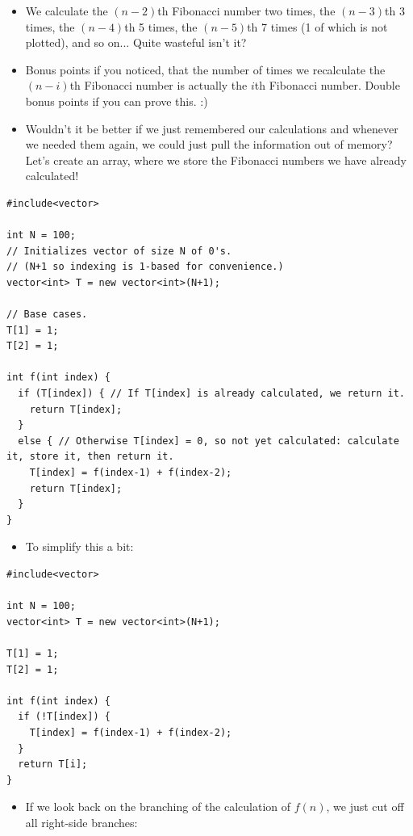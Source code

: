 \begin{itemize}
    \item We calculate the $(n-2)$th Fibonacci number two times, the $(n-3)$th 3 times, the $(n-4)$th 5 times, the $(n-5)$th 7 times (1 of which is not plotted), and so on... Quite wasteful isn't it?
    \item Bonus points if you noticed, that the number of times we recalculate the $(n-i)$th Fibonacci number is actually the $i$th Fibonacci number. Double bonus points if you can prove this. :)
    \item Wouldn't it be better if we just remembered our calculations and whenever we needed them again, we could just pull the information out of memory? Let's create an array, where we store the Fibonacci numbers we have already calculated!
\end{itemize}

\begin{verbatim}
#include<vector>

int N = 100;
// Initializes vector of size N of 0's.
// (N+1 so indexing is 1-based for convenience.)
vector<int> T = new vector<int>(N+1);

// Base cases.
T[1] = 1;
T[2] = 1; 

int f(int index) {
  if (T[index]) { // If T[index] is already calculated, we return it.
    return T[index];
  }
  else { // Otherwise T[index] = 0, so not yet calculated: calculate it, store it, then return it.
    T[index] = f(index-1) + f(index-2);
    return T[index];
  }
}
\end{verbatim}

\begin{itemize}
\item To simplify this a bit:
\end{itemize}

\begin{verbatim}
#include<vector>

int N = 100;
vector<int> T = new vector<int>(N+1);

T[1] = 1;
T[2] = 1; 

int f(int index) {
  if (!T[index]) {
    T[index] = f(index-1) + f(index-2);
  }
  return T[i];
}
\end{verbatim}

\begin{itemize}
    \item If we look back on the branching of the calculation of $f(n)$, we just cut off all right-side branches:
\end{itemize}


